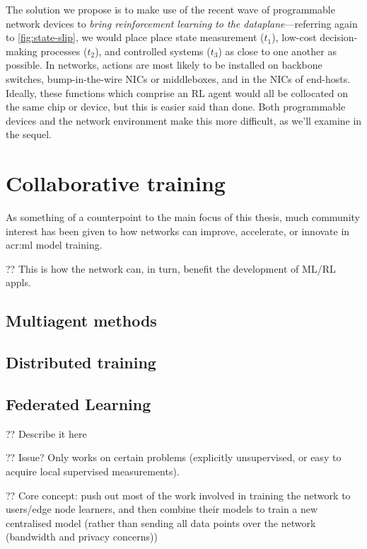 
The solution we propose is to make use of the recent wave of programmable network devices to \emph{bring reinforcement learning to the dataplane}---referring again to \cref{fig:state-slip}, we would place place state measurement ($t_1$), low-cost decision-making processes ($t_2$), and controlled systems ($t_3$) as close to one another as possible.
In networks, actions are most likely to be installed on backbone switches, bump-in-the-wire NICs or middleboxes, and in the NICs of end-hosts.
Ideally, these functions which comprise an RL agent would all be collocated on the same chip or device, but this is easier said than done. 
Both programmable devices and the network environment make this more difficult, as we'll examine in the sequel.

\section{Collaborative training}
As something of a counterpoint to the main focus of this thesis, much community interest has been given to how networks can improve, accelerate, or innovate in \gls{acr:ml} model training.

?? This is how the network can, in turn, benefit the development of ML/RL appls.

\subsection{Multiagent methods}

\subsection{Distributed training}

\subsection{Federated Learning}

?? Describe it here

?? Issue? Only works on certain problems (explicitly unsupervised, or easy to acquire local supervised measurements).

?? Core concept: push out most of the work involved in training the network to users/edge node learners, and then combine their models to train a new centralised model (rather than sending all data points over the network (bandwidth and privacy concerns))

